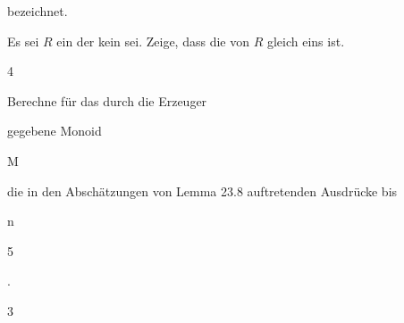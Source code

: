  bezeichnet.



{}

{


Es sei $R$ ein
der kein
 sei. Zeige, dass die
 von $R$ gleich eins ist.


}

{} {}





{4}

{


Berechne für das durch die Erzeuger

 gegebene Monoid


\mavergleichskette

{\vergleichskette

{ M
}

{ \subseteq }{ \N
}

{  }{
}

{    }{
}

{   }{
}

}
{}{}{}
die in den Abschätzungen von
Lemma 23.8
auftretenden Ausdrücke bis


\mavergleichskette

{\vergleichskette

{ n
}

{ \leq }{ 5
}

{  }{
}

{    }{
}

{   }{
}

}
{}{}{.}


}

{} {}



{3}

